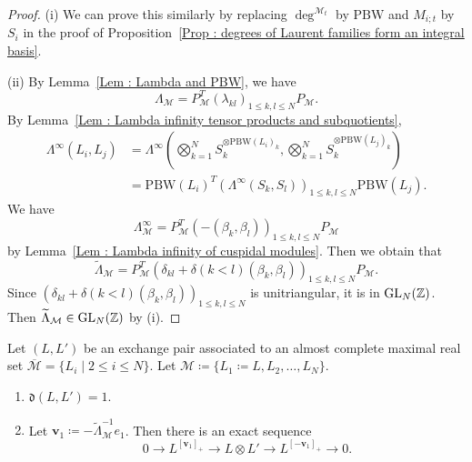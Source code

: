 \begin{proof}
(i) We can prove this similarly by replacing $\deg^{\mathcal M_t}$
by $\mathrm{PBW}$ and $M_{i;t}$ by $S_i$ in the proof of
Proposition~\ref{Prop : degrees of Laurent families form an integral basis}.

(ii) By Lemma~\ref{Lem : Lambda and PBW}, we have
\[
\Lambda_{\mathcal M}
= P_{\mathcal M}^{T}(\lambda_{kl})_{1 \leq k, l \leq N}P_{\mathcal M}.
\]
By Lemma~\ref{Lem : Lambda infinity tensor products and subquotients},
\[
\begin{aligned}
\Lambda^{\infty}(L_i, L_j)
&= \Lambda^{\infty}\left(
\bigotimes_{k=1}^{N} S_k^{\otimes\mathrm{PBW}(L_i)_k},
\bigotimes_{k=1}^{N} S_k^{\otimes\mathrm{PBW}(L_j)_k}
\right) \\
&= \mathrm{PBW}(L_i)^{T}
(\Lambda^{\infty}(S_k, S_l))_{1 \leq k, l \leq N}
\mathrm{PBW}(L_j).
\end{aligned}
\]
We have
\[
\Lambda^{\infty}_{\mathcal M}
= P_{\mathcal M}^{T}(- (\beta_k, \beta_l))_{1 \leq k, l \leq N}
P_{\mathcal M}
\]
by Lemma~\ref{Lem : Lambda infinity of cuspidal modules}.
Then we obtain that
\[
\widetilde{\Lambda}_{\mathcal M}
= P_{\mathcal M}^{T}
(\delta_{kl} + \delta(k < l)(\beta_k, \beta_l))_{1 \leq k, l \leq N}
P_{\mathcal M}.
\]
Since $(\delta_{kl} + \delta(k < l)(\beta_k, \beta_l))_{1 \leq k, l \leq N}$
is unitriangular, it is in $\mathrm{GL}_N(\mathbb{Z})$.
Then $\widetilde{\Lambda}_{\mathcal M} \in \mathrm{GL}_N(\mathbb{Z})$ by (i).
\end{proof}

\begin{Thm}
\label{Thm : exact sequence for an exchange pair}
Let $(L, L')$ be an exchange pair associated to an almost complete
maximal real set
$\overline{\mathcal{M}} = \{L_i \mid 2 \leq i \leq N\}$.
Let $\mathcal{M} \coloneq \{L_1 \coloneq L, L_2, \ldots, L_N\}$.
\begin{enumerate}
    \item[(i)] $\mathfrak{d}(L, L') = 1$.
    \item[(ii)] Let
    $\mathbf{v}_1 \coloneq -\widetilde{\Lambda}_{\mathcal{M}}^{-1}e_1$.
    Then there is an exact sequence
    \[
    0 \longrightarrow L^{[\mathbf{v}_1]_+}
    \longrightarrow L \otimes L'
    \longrightarrow L^{[-\mathbf{v}_1]_+}
    \longrightarrow 0.
    \]
\end{enumerate}
\end{Thm}

